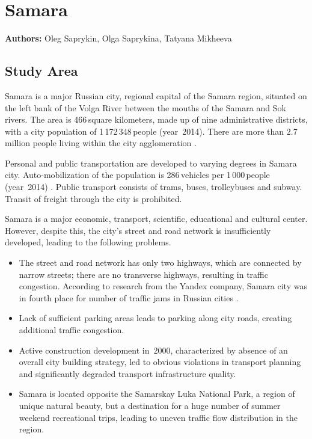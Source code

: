\chapter{Samara}
\label{ch:samara}
\hfill \textbf{Authors:} Oleg Saprykin, Olga Saprykina, Tatyana Mikheeva

\section{Study Area}
Samara is a major Russian city, regional capital of the Samara region, situated on the left bank of the Volga River between the mouths of the Samara and Sok rivers. The area is 466\,square kilometers, made up of nine administrative districts, with a city population of  1\,172\,348\,people (year~2014). There are more than 2.7\,million people living within the city agglomeration \citep[][]{GKS_2010}.

Personal and public transportation are developed to varying degrees in Samara city. Auto-mobilization of the population is 286\,vehicles per 1\,000\,people (year~2014) \citep[][]{Gradoteka_2015}. Public transport consists of trams, buses, trolleybuses and subway. Transit of freight through the city is prohibited.

Samara is a major economic, transport, scientific, educational and cultural center. However, despite this, the city's street and road network is insufficiently developed, leading to the following problems.

\begin{itemize}
\item The street and road network has only two highways, which are connected by narrow streets; there are no transverse highways, resulting in traffic congestion. According to research from the Yandex company, Samara city was in fourth place for number of traffic jams in Russian cities \citep[][]{Yandex_2013}.
\item Lack of sufficient parking areas leads to parking along city roads, creating additional traffic congestion.
\item Active construction development in~2000, characterized by absence of an overall city building strategy, led to obvious violations in transport planning and significantly degraded  transport infrastructure quality.
\item Samara is located opposite the Samarskay Luka National Park, a region of unique natural beauty, but a destination for a huge number of summer weekend recreational trips, leading to uneven traffic flow distribution in the region.
\end{itemize}

